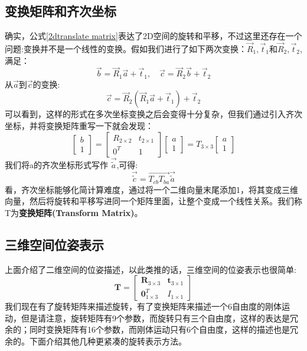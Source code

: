 \subsection{变换矩阵和齐次坐标}
确实，公式\ref{2dtranslate matrix}表达了2D空间的旋转和平移，不过这里还存在一个问题:变换并不是一个线性的变换。假如我们进行了如下两次变换：$\vec R_1,\vec t_1$和$\vec R_2,\vec t_2$,满足：
\begin{equation}
\vec b = \vec R_1 \vec a + \vec t_1,\quad \vec c=\vec R_2 \vec b + \vec t_2
\end{equation}
从$\vec a$到$\vec c$的变换:
\begin{equation}
\vec c=\vec R_2(\vec R_1 \vec a + \vec t_1) + \vec t_2
\end{equation}
可以看到，这样的形式在多次坐标变换之后会变得十分复杂，但我们通过引入齐次坐标，并将变换矩阵重写一下就会发现：
\begin{equation}
\left[ \begin{array}{l}{b} \\ {1}\end{array}\right]=\left[ \begin{array}{ll}{R_{2\times 2}} & {t_{2\times 1}} \\ {0^{T}} & {1}\end{array}\right] \left[ \begin{array}{l}{a} \\ {1}\end{array}\right] = T_{3\times 3} \left[ \begin{array}{l}{a} \\ {1}\end{array}\right]
\end{equation}
我们将a的齐次坐标形式写作 $\vec{\widetilde{a}}$,可得:
\begin{equation}
\vec{\widetilde{c}} =\vec{ T_{cb}T_{ba}}\vec{\widetilde{a}}
\end{equation}
看，齐次坐标能够化简计算难度，通过将一个二维向量末尾添加1，将其变成三维向量，然后将旋转和平移写进同一个矩阵里面，让整个变成一个线性关系。我们称T为\textbf{变换矩阵(Transform Matrix)}。\par
\subsection{三维空间位姿表示}
上面介绍了二维空间的位姿描述，以此类推的话，三维空间的位姿表示也很简单:
\begin{equation}
\boldsymbol{T}=\left[ \begin{array}{ll}{\boldsymbol{R}_{3 \times 3}} & {\boldsymbol{t}_{3 \times 1}} \\ {\mathbf{0}_{1 \times 3}^{T}} & {I_{1 \times 1}}\end{array}\right]
\end{equation}
我们现在有了旋转矩阵来描述旋转，有了变换矩阵来描述一个6自由度的刚体运动，但是请注意，旋转矩阵有9个参数，而旋转只有三个自由度，这样的表达是冗余的；同时变换矩阵有16个参数，而刚体运动只有6个自由度，这样的描述也是冗余的。下面介绍其他几种更紧凑的旋转表示方法。
